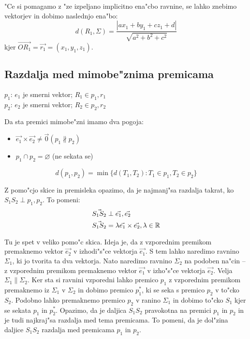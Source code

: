 "Ce si pomagamo z "ze izpeljano implicitno ena"cbo ravnine, se lahko znebimo vektorjev in dobimo naslednjo ena"bo:
\begin{equation*}
d(R_1, \Sigma) = \dfrac{|ax_1 + by_1 + cz_1 + d|}{\sqrt{a^2 + b^2 + c^2}}
\end{equation*}
kjer $\vec{OR_1} = \vec{r_1} = (x_1, y_1, z_1)$.

\subsection{Razdalja med mimobe"znima premicama}
$p_1$: $e_1$ je smerni vektor; $R_1 \in p_1, r_1$\\
$p_2$: $e_2$ je smerni vektor; $R_2 \in p_2, r_2$

Da sta premici mimobe"zni imamo dva pogoja:
\begin{itemize}
	\item $\vec{e_1} \times \vec{e_2} \neq \vec{0} (p_1 \nparallel p_2)$
	\item $p_1 \cap p_2 = \varnothing$ (ne sekata se)
\end{itemize}

\begin{equation*}
d(p_1, p_2) = \min \{d(T_1, T_2): T_1 \in p_1, T_2 \in p_2\}
\end{equation*}

Z pomo"cjo skice in premisleka opazimo, da je najmanj"sa razdalja takrat, ko $S_1S_2 \perp p_1, p_2$. To pomeni:
\begin{align*}
\vec{S_1S_2} & \perp \vec{e_1}, \vec{e_2}\\
\vec{S_1S_2} &= \lambda \vec{e_1} \times \vec{e_2}, \lambda \in \mathbb{R}
\end{align*}

Tu je spet v veliko pomo"c skica. Ideja je, da z vzporednim premikom premaknemo vektor $\vec{e_2}$ v izhodi"s"ce vektorja $\vec{e_1}$. S tem lahko naredimo ravnino $\Sigma_1$, ki jo tvorita ta dva vektorja. Nato naredimo ravnino $\Sigma_2$ na podoben na"cin -- z vzporednim premikom premaknemo vektor $\vec{e_1}$ v izho"s"ce vektorja $\vec{e_2}$. Velja $\Sigma_1 \parallel \Sigma_2$. Ker sta si ravnini vzporedni lahko premico $p_1$ z vzporednim premikom premaknemo iz $\Sigma_1$ v $\Sigma_2$ in dobimo premico $p_1^*$, ki se seka s premico $p_2$ v to"cko $S_2$. Podobno lahko premaknemo premico $p_2$ v ranino $\Sigma_1$ in dobimo to"cko $S_1$ kjer se sekata $p_1$ in $p_2^*$. Opazimo, da je daljica $S_1S_2$ pravokotna na premici $p_1$ in $p_2$ in je tudi najkraj"sa razdalja med tema premicama. To pomeni, da je dol"zina daljice $S_1S_2$ razdalja med premicama $p_1$ in $p_2$.

